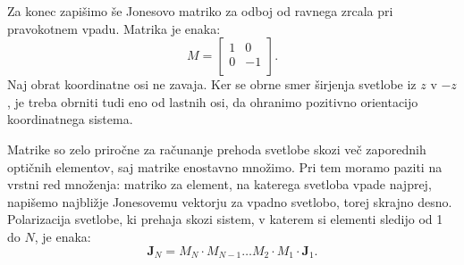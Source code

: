 Za konec zapišimo še Jonesovo matriko za odboj od ravnega zrcala pri
pravokotnem vpadu. Matrika je enaka:
\begin{equation}
M = \left[\begin{array}{cc}
1 & 0 \\
0 & -1\\
\end{array}\right]\!\!.
\label{eq:03_59}
\end{equation}
Naj obrat koordinatne osi ne zavaja. Ker se obrne smer 
širjenja svetlobe iz $z$ v $-z$, je treba obrniti tudi eno od lastnih osi, 
da ohranimo pozitivno orientacijo koordinatnega sistema. 

Matrike so zelo priročne za računanje prehoda svetlobe skozi več
zaporednih optičnih elementov, saj matrike enostavno množimo. Pri tem 
moramo paziti na vrstni red množenja: matriko za element, na katerega
svetloba vpade najprej, napišemo najbližje Jonesovemu vektorju za vpadno svetlobo, 
torej skrajno desno. Polarizacija svetlobe, ki prehaja skozi sistem, 
v katerem si elementi sledijo od 1 do $N$, je enaka:
\begin{equation}
\mathbf{J}_N = M_N \cdot M_{N-1} \dots M_2 \cdot M_1 \cdot \mathbf{J}_1.
\label{eq:03_60}
\end{equation}

